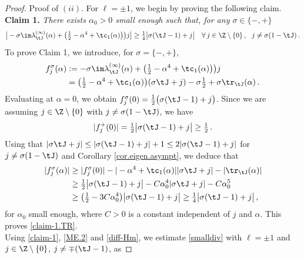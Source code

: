\documentclass[a4paper,reqno,10pt]{article}
\begin{document}
\begin{proof}
     {\sc Proof of $(ii)$}. For $\ell= \pm 1$, we begin by proving the following claim.
   \\[1mm]
   {\bf Claim 1.} {\it There exists $\alpha_{0}>0$ small enough such that, for any $\sigma\in \{-,+\}$}
    \begin{equation}\label{claim-1.TR}
    	\big| -\sigma \im \lambda_{\tJ}^{(\infty)}(\alpha)  + \big( \tfrac12 -\alpha^4 + \tc_{1}(\alpha) \big)  \big)j  \big| \geq \tfrac14\big| \sigma(\tJ-1)+j \big|  \quad \forall \, j \in\Z\setminus\{0\}\,, \ \ j\neq\sigma(1-\tJ) \,.
    \end{equation}   
To prove Claim 1, we introduce, for $\sigma=\{-,+\}$,
\begin{align}
  		f_j^{\sigma}(\alpha)& := -\sigma \im \lambda_{\tJ}^{(\infty)}(\alpha)  + \big( \tfrac12 -\alpha^4 + \tc_{1}(\alpha) \big)  \big)j \\
        & =  \big( \tfrac12 - \alpha^4 +\tc_{1}(\alpha)  \big)(\sigma \tJ  +j) -\sigma \tfrac12 +\sigma \tr_{\tJ}(\alpha)\,.\label{ell.pm1.TR}
  	\end{align}
Evaluating at $\alpha=0$, we obtain $f_{j}^{\sigma}(0) = \tfrac12 \big( \sigma (\tJ-1) + j \big)$.
Since we are assuming $j\in\Z\setminus\{0\}$ with $j\neq \sigma(1-\tJ)$, we have 
\begin{equation}
    |f_{j}^+(0)|  = \tfrac12 \big| \sigma(\tJ-1)+j \big|\geq \tfrac12 \,.
\end{equation}
Using that $|\sigma\tJ+j|\leq |\sigma(\tJ-1)+j|+1 \leq 2 |\sigma(\tJ-1)+j|$ for $j\neq \sigma(1-\tJ)$ and Corollary \ref{cor.eigen.asympt}, we deduce that
\begin{align}
    |f_{j}^\sigma(\alpha)| & \geq |f_{j}^\sigma(0)| - |-\alpha^4+\tc_{1}(\alpha)| |\sigma\tJ+j| - |\tr_{\tJ}(\alpha)| \\
     & \geq \tfrac12 \big| \sigma(\tJ-1)+j \big| - C\alpha_0^4|\sigma\tJ +j| -C\alpha_0^5 \\
    & \geq \big( \tfrac12 - 3 C \alpha_0^4  \big)\big| \sigma(\tJ-1)+j \big| \geq \tfrac14 \big| \sigma(\tJ-1)+j \big| \,,
\end{align}
for $\alpha_{0}$ small enough, where $C>0$ is a constant independent of $j$ and $\alpha$. This proves \eqref{claim-1.TR}.
  \\[1mm]
  Using \eqref{claim-1},  \eqref{ME.2} and \eqref{diff-Hm}, we estimate \eqref{smalldiv} with $\ell = \pm 1$  and $j\in \Z\setminus\{0\}$, $j\neq \mp(\tJ-1)$, as

\end{proof}
\end{document}

